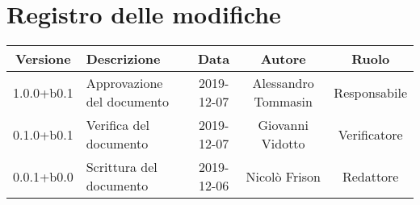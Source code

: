 \section*{Registro delle modifiche}

\begin{center}
	\begin{longtable}{|c|p{3cm}|c|c|c|}
	\hline
	\rowcolor{lighter-grayer}
	\textbf{Versione} & \textbf{Descrizione} & \textbf{Data} & \textbf{Autore} & \textbf{Ruolo} \\
	\hline
	\endfirsthead


	1.0.0+b0.1 & Approvazione del documento & 2019-12-07 & Alessandro Tommasin & Responsabile \\
	\hline
	0.1.0+b0.1 & Verifica del documento & 2019-12-07 & Giovanni Vidotto & Verificatore \\
	\hline
	0.0.1+b0.0 & Scrittura del documento & 2019-12-06 & Nicolò Frison & Redattore \\
	\hline

	\end{longtable}
\end{center}